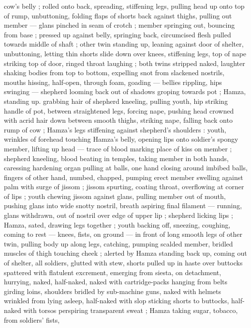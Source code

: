 cow's belly ; rolled onto back, spreading, stiffening legs, pulling head up onto top of rump, unbuttoning, folding flaps of shorts back against thighs, pulling out member --- glans pinched in seam of crotch ; member springing out, bouncing from base ; pressed up against belly, springing back, circumcised flesh pulled towards middle of shaft ; other twin standing up, leaning against door of shelter, unbuttoning, letting thin shorts slide down over knees, stiffening legs, top of nape striking top of door, ringed throat laughing ; both twins stripped naked, laughter shaking bodies from top to bottom, expelling snot from slackened nostrils, mouths hissing, half-open, through foam, goading --- bellies rippling, hips swinging --- shepherd looming back out of shadows groping towards pot ; Hamza, standing up. grabbing hair of shepherd kneeling, pulling youth, hip striking handle of pot, between straightened legs, forcing nape, pushing head crowned with acrid hair down between smooth thighs, striking nape, falling back onto rump of cow ; Hamza's legs stiffening against shepherd's shoulders : youth, wrinkles of forehead touching Hamza's belly, opening lips onto soldier's spongy member, lifting up head --- trace of blood marking place of kiss on member ; shepherd kneeling, blood beating in temples, taking member in both hands, caressing hardening organ pulling at balls, one hand closing around imbibed balls, fingers of other hand, numbed, chapped, pumping erect member swelling against palm with surge of jissom ; jissom spurting, coating throat, overflowing at corner of lips ; youth chewing jissom against glans, pulling member out of mouth, pushing glans into wide snotty nostril, breath aspiring final filament --- running, glans withdrawn, out of nostril over edge of upper lip ; shepherd licking lips ; Hamza, sated, drawing legs together ; youth backing off, sneezing, coughing, coming to rest --- knees, fists, on ground --- in front of long smooth legs of other twin, pulling body up along legs, catching, pumping scalded member, bridled muscles of thigh touching cheek ; alerted by Hamza standing back up, coming out of shelter, all soldiers, glutted with stew, shorts pulled up in haste over buttocks spattered 
with flatulent excrement, emerging from siesta, on detachment, 
hurrying, naked, half-naked, naked with cartridge-packs hanging 
from belts girding loins, shoulders bridled by sub-machine guns, 
naked with helmets wrinkled from lying asleep, half-naked with slop 
sticking shorts to buttocks, half-naked with torsos perspiring 
transparent sweat ; Hamza taking sugar, tobacco, from soldiers' fists, 
